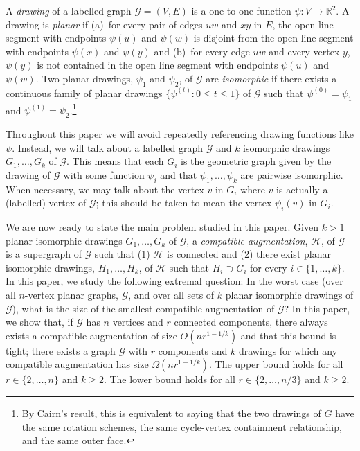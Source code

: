 \documentclass{patmorin}
\newcommand{\R}{\mathbb{R}}
\begin{document}
A \emph{drawing} of a labelled graph $\mathcal{G}=(V,E)$ is a one-to-one
function $\psi\colon V\to\R^2$.  A drawing is \emph{planar} if (a)~for
every pair of edges $uw$ and $xy$ in $E$, the open line segment with
endpoints $\psi(u)$ and $\psi(w)$ is disjoint from the open line
segment with endpoints $\psi(x)$ and $\psi(y)$ and (b)~for every edge
$uw$ and every vertex $y$, $\psi(y)$ is not contained in the open line
segment with endpoints $\psi(u)$ and $\psi(w)$.  Two planar drawings,
$\psi_1$ and $\psi_2$, of $\mathcal{G}$ are \emph{isomorphic} if
there exists a continuous family of planar drawings $\{\psi^{(t)}
\colon 0\le t\le 1\}$ of $\mathcal{G}$ such that $\psi^{(0)}=\psi_1$
and $\psi^{(1)}=\psi_2$.\footnote{By Cairn's result, this is equivalent
to saying that the two drawings of $G$ have the same rotation schemes,
the same cycle-vertex containment relationship, and the same outer face.}

Throughout this paper we will avoid repeatedly referencing drawing
functions like $\psi$.  Instead, we will talk about a labelled
graph $\mathcal{G}$ and $k$ isomorphic drawings $G_1,\ldots,G_k$ of
$\mathcal G$.  This means that each $G_i$ is the geometric graph given
by the drawing of $\mathcal{G}$ with some function $\psi_i$ and that
$\psi_1,\ldots,\psi_k$ are pairwise isomorphic. When necessary, we may talk
about the vertex $v$ in $G_i$ where $v$ is actually a (labelled) vertex
of $\mathcal{G}$; this should be taken to mean the vertex $\psi_i(v)$
in $G_i$.

We are now ready to state the main problem studied in this paper.  Given $k>1$
planar isomorphic drawings $G_1, \ldots, G_k$ of $\mathcal
G$, a \emph{compatible augmentation}, $\mathcal H$, of $\mathcal G$ is
a supergraph of $\mathcal G$ such that (1) $\mathcal H$ is connected
and (2) there exist planar isomorphic drawings, $H_1,
\ldots, H_k$, of $\mathcal H$ such that $H_i\supset G_i$ for every
$i\in\{1,\ldots,k\}$.  In this paper, we study the following extremal question: In the worst case
(over all $n$-vertex planar graphs, $\mathcal G$, and over all sets of
$k$ planar isomorphic drawings of $\mathcal{G}$), what is the size of the smallest compatible augmentation of $\mathcal G$?
In this paper, we show that, if $\mathcal{G}$
has $n$ vertices and $r$ connected components, there always exists a
compatible augmentation of size $O(nr^{1-1/k})$ and that this bound
is tight; there exists a graph $\mathcal G$
with $r$ components and $k$ drawings for which any compatible augmentation
has size $\Omega(nr^{1-1/k})$.  The upper bound holds for all $r\in\{2,\ldots,n\}$ and $k\ge 2$. The lower bound holds for all $r\in\{2,\ldots,n/3\}$ and $k\ge 2$.
\end{document}
